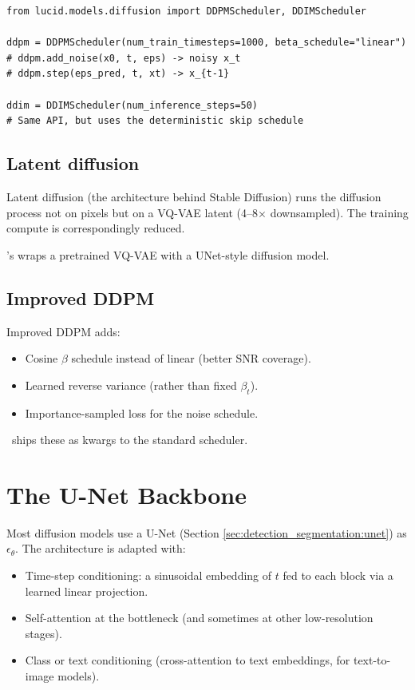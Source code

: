\begin{lstlisting}[style=lucid,language=LucidPython]
from lucid.models.diffusion import DDPMScheduler, DDIMScheduler

ddpm = DDPMScheduler(num_train_timesteps=1000, beta_schedule="linear")
# ddpm.add_noise(x0, t, eps) -> noisy x_t
# ddpm.step(eps_pred, t, xt) -> x_{t-1}

ddim = DDIMScheduler(num_inference_steps=50)
# Same API, but uses the deterministic skip schedule
\end{lstlisting}

\subsection{Latent diffusion}
\label{ssec:generative:latent_diffusion}

Latent diffusion \cite{rombach_ldm_2022} (the architecture
behind Stable Diffusion) runs the diffusion process not on
pixels but on a VQ-VAE latent (4--8$\times$ downsampled).
The training compute is correspondingly reduced.

\Lucid's  wraps a
pretrained VQ-VAE with a UNet-style diffusion model.

\subsection{Improved DDPM}
\label{ssec:generative:iddpm}

Improved DDPM \cite{nichol_iddpm_2021} adds:
\begin{itemize}
  \item Cosine $\beta$ schedule instead of linear (better
    SNR coverage).
  \item Learned reverse variance (rather than fixed $\beta_t$).
  \item Importance-sampled loss for the noise schedule.
\end{itemize}

\Lucid\ ships these as kwargs to the standard scheduler.

\section{The U-Net Backbone}
\label{sec:generative:unet_diffusion}

Most diffusion models use a U-Net (Section
\ref{sec:detection_segmentation:unet}) as $\epsilon_\theta$.
The architecture is adapted with:
\begin{itemize}
  \item Time-step conditioning: a sinusoidal embedding of $t$
    fed to each block via a learned linear projection.
  \item Self-attention at the bottleneck (and sometimes at
    other low-resolution stages).
  \item Class or text conditioning (cross-attention to text
    embeddings, for text-to-image models).
\end{itemize}

